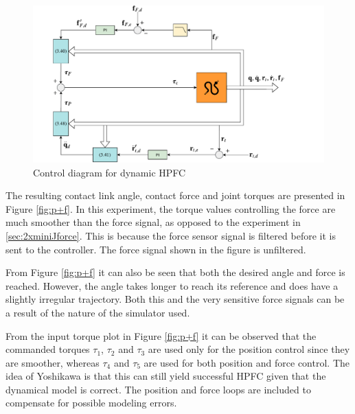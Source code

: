 \begin{figure}
    \centering
    \includegraphics[trim=1cm 0cm 3cm 0cm, clip=true, width=\textwidth]{figures/experiments/control-diagrams/pf-control-diagram.pdf}
    \caption{Control diagram for dynamic HPFC}
    \label{fig:diag-pf}
\end{figure}
\newpage
The resulting contact link angle, contact force and joint torques are presented in Figure \ref{fig:p+f}. In this experiment, the torque values controlling the force are much smoother than the force signal, as opposed to the experiment in \ref{sec:2xminiJforce}. This is because the force sensor signal is filtered before it is sent to the controller. The force signal shown in the figure is unfiltered.

From Figure \ref{fig:p+f} it can also be seen that both the desired angle and force is reached. However, the angle takes longer to reach its reference and does have a slightly irregular trajectory. Both this and the very sensitive force signals can be a result of the nature of the simulator used.

From the input torque plot in Figure \ref{fig:p+f} it can be observed that the commanded torques $\tau_1$, $\tau_2$ and $\tau_3$ are used only for the position control since they are smoother, whereas $\tau_4$ and $\tau_5$ are used for both position and force control. The idea of Yoshikawa \cite{yoshikawa1987dynamic} is that this can still yield successful HPFC given that the dynamical model is correct. The position and force loops are included to compensate for possible modeling errors.

